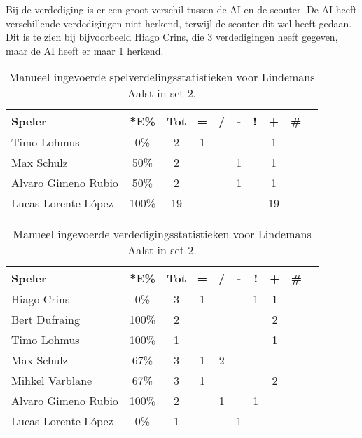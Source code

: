 Bij de verdediging is er een groot verschil tussen de AI en de scouter. De AI heeft verschillende verdedigingen niet herkend, terwijl de scouter dit wel heeft gedaan. Dit is te zien bij bijvoorbeeld Hiago Crins, die 3 verdedigingen heeft gegeven, maar de AI heeft er maar 1 herkend.

\begin{table}[ht!]
  \centering
  \scriptsize
    \begin{tabular}{|l|c|c|c|c|c|c|c|c|c|} \hline
      \textbf{Speler} & *E\% & Tot & = & / & - & ! & + & \# \\ \hline
      Timo Lohmus & 0\% & 2 & 1 &  &  &  & 1 &   \\
      Max Schulz & 50\% & 2 &  &  & 1 & & 1 &  \\
      Alvaro Gimeno Rubio & 50\% & 2 &  &  & 1 &  & 1 &   \\ 
      Lucas Lorente López & 100\% & 19 &  &  &  &  & 19 &  \\ \hline
  \end{tabular}
  \caption[Manueel ingevoerde spelverdelingsstatistieken voor Lindemans Aalst in set 2]{\label{tab:PL1SetAalstMan2}Manueel ingevoerde spelverdelingsstatistieken voor Lindemans Aalst in set 2.}
\end{table}

\begin{table}[ht!]
  \centering
  \scriptsize
    \begin{tabular}{|l|c|c|c|c|c|c|c|c|c|}
      \hline
      \textbf{Speler} & *E\% & Tot & = & / & - & ! & + & \# \\ \hline
      Hiago Crins & 0\% & 3 & 1 &  &  & 1 & 1 &  \\ 
      Bert Dufraing & 100\% & 2 &  &  &  &  & 2 &  \\
      Timo Lohmus & 100\% & 1 &  &  &  &  & 1 &  \\
      Max Schulz & 67\% & 3 & 1 & 2 &  &  &  &  \\
      Mihkel Varblane & 67\% & 3 & 1 &  &  &  & 2 &  \\
      Alvaro Gimeno Rubio & 100\% & 2 &  & 1 &  & 1 &  &  \\
      Lucas Lorente López & 0\% & 1 &  &  & 1 &  &  &  \\ \hline
  \end{tabular}
  \caption[Manueel ingevoerde verdedigingsstatistieken voor Lindemans Aalst in set 2]{\label{tab:PL1DigAalstMan2}Manueel ingevoerde verdedigingsstatistieken voor Lindemans Aalst in set 2.}
\end{table}

